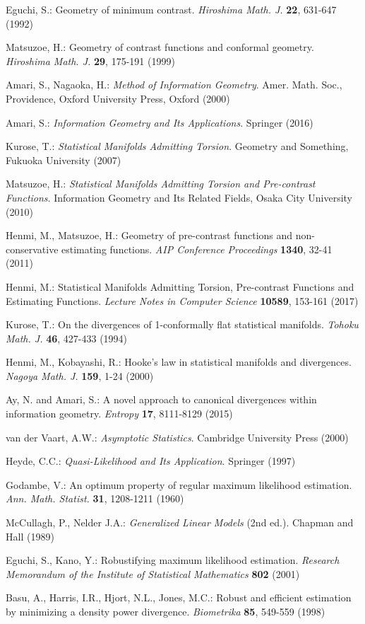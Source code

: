 \documentclass[graybox]{svmult}
\begin{document}
\begin{thebibliography}{99.}
%
Eguchi, S.:
Geometry of minimum contrast.
{\em Hiroshima Math. J.} \textbf{22}, 631-647 (1992)

Matsuzoe, H.:
Geometry of contrast functions and conformal geometry.
{\em Hiroshima Math. J.} \textbf{29}, 175-191 (1999)

Amari, S., Nagaoka, H.:
{\em Method of Information Geometry}.
Amer. Math. Soc., Providence, Oxford University Press, Oxford (2000)

Amari, S.:
{\em Information Geometry and Its Applications}. Springer (2016)

Kurose, T.:
{\em Statistical Manifolds Admitting Torsion}.
Geometry and Something, Fukuoka University (2007)

Matsuzoe, H.:
{\em Statistical Manifolds Admitting Torsion and Pre-contrast Functions}.
Information Geometry and Its Related Fields, Osaka City University (2010)

Henmi, M., Matsuzoe, H.:
Geometry of pre-contrast functions and non-conservative estimating functions.
{\em AIP Conference Proceedings} \textbf{1340}, 32-41 (2011)

Henmi, M.:
Statistical Manifolds Admitting Torsion, Pre-contrast Functions and Estimating
Functions.
{\em Lecture Notes in Computer Science} \textbf{10589}, 153-161 (2017)

Kurose, T.:
On the divergences of 1-conformally flat statistical manifolds.
{\em Tohoku Math. J.} \textbf{46}, 427-433 (1994)

Henmi, M., Kobayashi, R.:
Hooke's law in statistical manifolds and divergences.
{\em Nagoya Math. J.} \textbf{159}, 1-24 (2000)

Ay, N. and Amari, S.:
A novel approach to canonical divergences within information geometry.
{\em Entropy} \textbf{17}, 8111-8129 (2015)

van der Vaart, A.W.:
{\em Asymptotic Statistics}.
Cambridge University Press (2000)

Heyde, C.C.:
{\em Quasi-Likelihood and Its Application}. Springer (1997)

Godambe, V.:
An optimum property of regular maximum likelihood estimation.
{\em Ann. Math. Statist.} \textbf{31}, 1208-1211 (1960)

McCullagh, P., Nelder J.A.:
{\em Generalized Linear Models} (2nd ed.).
Chapman and Hall (1989)

Eguchi, S., Kano, Y.:
Robustifying maximum likelihood estimation.
{\em Research Memorandum of the Institute of Statistical Mathematics}
\textbf{802} (2001)

Basu, A., Harris, I.R., Hjort, N.L., Jones, M.C.:
Robust and efficient estimation by minimizing a density power divergence.
{\em Biometrika} \textbf{85}, 549-559 (1998)
%
\end{thebibliography}
\end{document}
